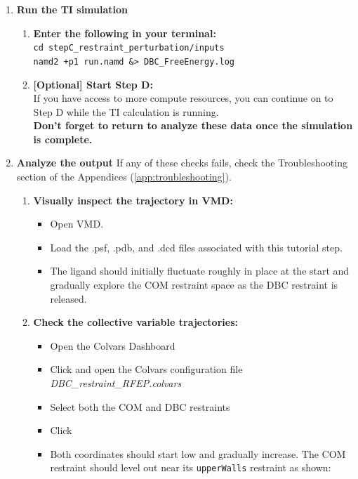 \documentclass[9pt,tutorial]{Styling/livecoms}
\newcommand{\filepath}[1]{\textit{#1}}
\newcommand{\button}[1]{
  \inlineBox[gray]{\texttt{#1}}
}
\newcommand{\textInput}[1]{
  \texttt{#1}
}
\begin{document}
\begin{enumerate}[label=\arabic*.]
        \item \textbf{Run the TI simulation} 
        \begin{enumerate}[label=\alph*., ref=\theenumi.\alph*]
            \item \textbf{Enter the following in your terminal:}\\
            \textInput{cd stepC\_restraint\_perturbation/inputs}\\
            \textInput{namd2 +p1 run.namd \&> DBC\_FreeEnergy.log}
            \item \textbf{[Optional] Start Step D:}\\
            If you have access to more compute resources, you can continue on to Step D while the TI calculation is running.\\
            \textbf{Don't forget to return to analyze these data once the simulation is complete.}
        \end{enumerate}
        \item \textbf{Analyze the output} \label{step:analyzeRFEP}
        If any of these checks fails, check the Troubleshooting section of the Appendices (\ref{app:troubleshooting}).
        \begin{enumerate}[label=\alph*., ref=\theenumi.\alph*]
            \item \textbf{Visually inspect the trajectory in VMD:}
            \begin{itemize}
                \item Open VMD.
                \item Load the .psf, .pdb, and .dcd files associated with this tutorial step.
                \item The ligand should initially fluctuate roughly in place at the start and gradually explore the COM restraint space as the DBC restraint is released. 
            \end{itemize}
            \item \textbf{Check the collective variable trajectories:}
            \begin{itemize}
                \item Open the Colvars Dashboard
                \item Click \button{Load} and open the Colvars configuration file \filepath{DBC\_restraint\_RFEP.colvars}
                \item Select both the COM and DBC restraints
                \item Click \button{Timeline plot}
                \item Both coordinates should start low and gradually increase. The COM restraint should level out near its \textInput{upperWalls} restraint as shown: 
                

\end{itemize}
\end{enumerate}
\end{enumerate}
\end{document}
